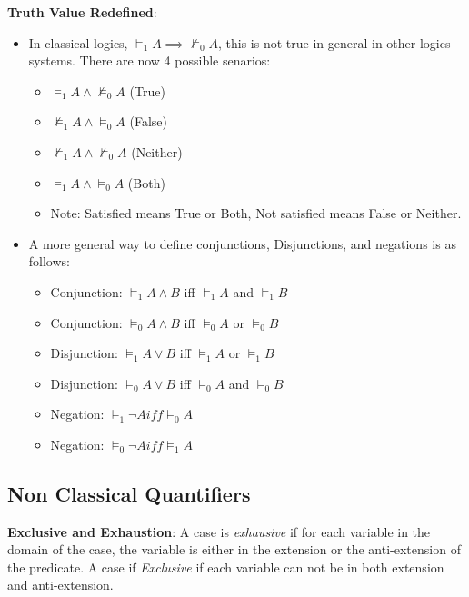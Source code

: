 \documentclass{article}
\begin{document}
\noindent \textbf{Truth Value Redefined}:
\begin{itemize}
    \item {In classical logics, $\models_1 A \implies \not \models_0 A$, this is not true in general in other logics systems. There are now 4 possible senarios:
        \begin{itemize}
            \large
            \item $\models_1 A \wedge \not \models_0 A$ (True)
            \item $\not\models_1 A \wedge  \models_0 A$ (False)
            \item $\not \models_1 A \wedge \not \models_0 A$ (Neither)
            \item $\models_1 A \wedge \models_0 A$ (Both)
            \item Note: Satisfied means True or Both, Not satisfied means False or Neither.
        \end{itemize}
    }
    \item {A more general way to define conjunctions, Disjunctions, and negations is as follows:
        \begin{itemize}
            \item Conjunction: $\models_1 A\wedge B$ iff $\models_1 A$ and $\models_1 B$
            \item Conjunction: $\models_0 A\wedge B$ iff $\models_0 A$ or $\models_0 B$\\
            \item Disjunction: $\models_1 A\vee B$ iff $\models_1 A$ or $\models_1 B$
            \item Disjunction: $\models_0 A\vee B$ iff $\models_0 A$ and $\models_0 B$\\
            \item Negation: $\models_1\lnot A iff \models_0A$
            \item Negation: $\models_0\lnot A iff \models_1A$
        \end{itemize}
    }
\end{itemize}

\subsection{Non Classical Quantifiers}
\large
\noindent \textbf{Exclusive and Exhaustion}:
A case is \emph{exhausive} if for each variable in the domain of the case, the variable is either
in the extension or the anti-extension of the predicate. 
A case if \emph{Exclusive} if each variable can not be in both extension and anti-extension.\\
\end{document}
